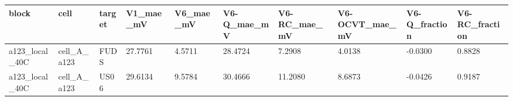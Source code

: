 \begin{tabular}{llllllllll}
\hline
block & cell & target & V1\_mae\_mV & V6\_mae\_mV & V6-Q\_mae\_mV & V6-RC\_mae\_mV & V6-OCVT\_mae\_mV & V6-Q\_fraction & V6-RC\_fraction \\
\hline
a123\_local\_40C & cell\_A\_a123 & FUDS & 27.7761 & 4.5711 & 28.4724 & 7.2908 & 4.0138 & -0.0300 & 0.8828 \\
a123\_local\_40C & cell\_A\_a123 & US06 & 29.6134 & 9.5784 & 30.4666 & 11.2080 & 8.6873 & -0.0426 & 0.9187 \\
\hline
\end{tabular}
